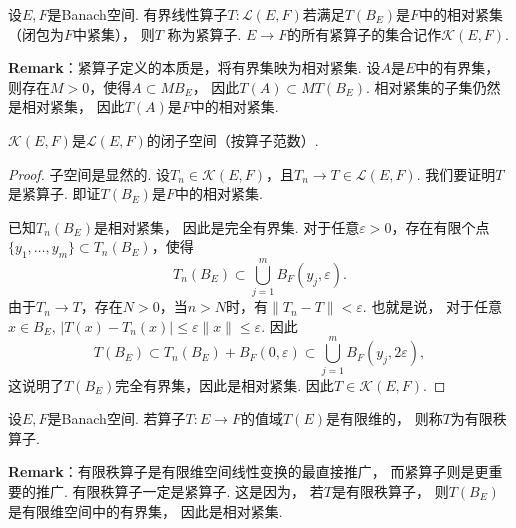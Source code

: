 

\begin{definition}[紧算子]
    \label{def:compact_operator}
    设$E,F$是Banach空间.
    有界线性算子$T : \mathcal{L}(E,F)$若满足$T(B_E)$是$F$中的相对紧集（闭包为$F$中紧集），
    则$T$ 
    称为紧算子.
    $E \to F$的所有紧算子的集合记作$\mathcal{K}(E,F)$.
\end{definition}

\begin{remarkbox}
\textbf{Remark}：紧算子定义的本质是，将有界集映为相对紧集.
设$A$是$E$中的有界集，则存在$M>0$，使得$A \subset MB_E$，
因此$T(A) \subset MT(B_E)$.
相对紧集的子集仍然是相对紧集，
因此$T(A)$是$F$中的相对紧集.
\end{remarkbox}

\begin{theorem}
    $\mathcal{K}(E,F)$是$\mathcal{L}(E,F)$的闭子空间（按算子范数）.
\end{theorem}


\begin{proof}
    子空间是显然的.
    设$T_n \in \mathcal{K}(E,F)$，且$T_n \to T \in \mathcal{L}(E,F)$.
    我们要证明$T$是紧算子.
    即证$T(B_E)$是$F$中的相对紧集.

    已知$T_n(B_E)$是相对紧集，
    因此是完全有界集.
    对于任意$\varepsilon>0$，存在有限个点$\{y_1,\dots,y_m\} \subset T_n(B_E)$，使得
    \[
        T_n(B_E) \subset \bigcup_{j=1}^m B_F(y_j,\varepsilon).
    \]
    由于$T_n \to T$，存在$N>0$，当$n>N$时，有$\|T_n-T\|<\varepsilon$.
    也就是说，
    对于任意$x \in B_E$,
    $|T(x) - T_n(x)| \le \varepsilon \|x\| \le \varepsilon$.
    因此
    \[
        T(B_E) \subset T_n(B_E) + B_F(0,\varepsilon)
        \subset \bigcup_{j=1}^m B_F(y_j,2\varepsilon),
    \]
    这说明了$T(B_E)$完全有界集，因此是相对紧集.
    因此$T\in\mathcal{K}(E,F)$. 
\end{proof}

    \begin{definition}[有限秩算子]
        \label{def:finite_rank_operator}
        设$E,F$是Banach空间.
        若算子$T : E \to F$的值域$T(E)$是有限维的，
        则称$T$为有限秩算子.
    \end{definition}

    \begin{remarkbox}
    \textbf{Remark}：有限秩算子是有限维空间线性变换的最直接推广，
    而紧算子则是更重要的推广.
    有限秩算子一定是紧算子.
    这是因为，
    若$T$是有限秩算子，
    则$T(B_E)$是有限维空间中的有界集，
    因此是相对紧集.
    \end{remarkbox}


